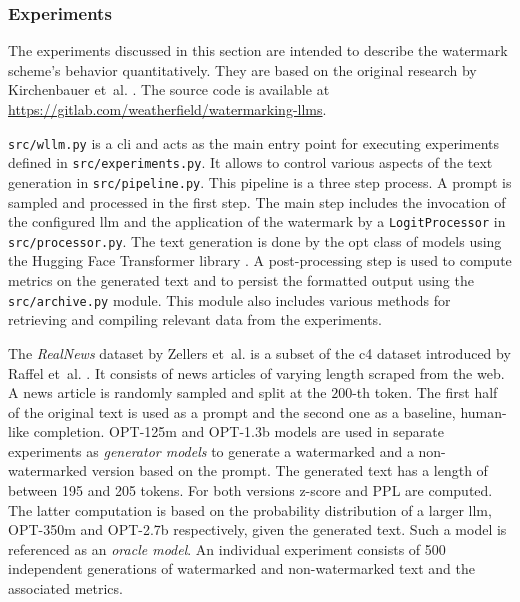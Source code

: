	\subsubsection{Experiments}
	\label{sec:watermarkingExperiments}
    The experiments discussed in this section are intended to describe the watermark scheme's behavior quantitatively.
    They are based on the original research by Kirchenbauer et~al. \cite{kirchenbauer2023watermark}.
    The source code is available at \url{https://gitlab.com/weatherfield/watermarking-llms}.
    
    \texttt{src/wllm.py} is a \ac{cli} and acts as the main entry point for executing experiments defined in \texttt{src/experiments.py}.
    It allows to control various aspects of the text generation in \texttt{src/pipeline.py}.
    This pipeline is a three step process.
    A prompt is sampled and processed in the first step.
    The main step includes the invocation of the configured \ac{llm} and the application of the watermark by a \texttt{LogitProcessor} in \texttt{src/processor.py}.
    The text generation is done by the \ac{opt} class of models \cite{zhang2022opt} using the Hugging Face Transformer library \cite{wolf2020huggingfaces}.
    A post-processing step is used to compute metrics on the generated text and to persist the formatted output using the \texttt{src/archive.py} module.
    This module also includes various methods for retrieving and compiling relevant data from the experiments.
    
    The \emph{RealNews} dataset by Zellers et~al. \cite{zellers2020defending} is a subset of the \ac{c4} dataset introduced by Raffel et~al. \cite{raffel2023exploring}.
    It consists of news articles of varying length scraped from the web.
    A news article is randomly sampled and split at the $200$-th token.
    The first half of the original text is used as a prompt and the second one as a baseline, human-like completion.
    OPT-125m and OPT-1.3b models are used in separate experiments as \emph{generator models} to generate a watermarked and a non-watermarked version based on the prompt.
    The generated text has a length of between 195 and 205 tokens.
    For both versions z-score and PPL are computed.
    The latter computation is based on the probability distribution of a larger \ac{llm}, OPT-350m and OPT-2.7b respectively, given the generated text.
    Such a model is referenced as an \emph{oracle model}.
    An individual experiment consists of 500 independent generations of watermarked and non-watermarked text and the associated metrics.
    
